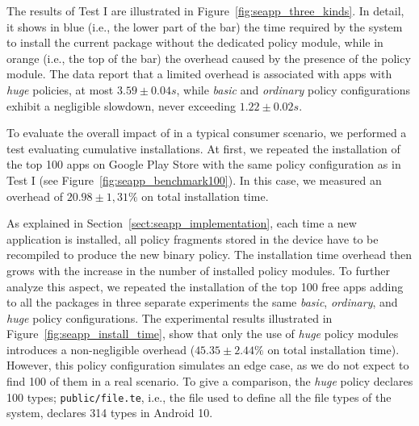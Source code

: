 The results of Test I are illustrated in
Figure~\ref{fig:seapp_three_kinds}.  In detail, it shows in blue
(i.e., the lower part of the bar) the time required by the system to
install the current package without the dedicated policy module, while
in orange (i.e., the top of the bar) the overhead caused by the
presence of the policy module.  The data report that a limited
overhead is associated with apps with \textit{huge} policies, at most
$3.59 \pm 0.04 s$, while \textit{basic} and \textit{ordinary} policy
configurations exhibit a negligible slowdown, never exceeding
$1.22 \pm 0.02 s$.

To evaluate the overall impact of \pap in a typical consumer scenario,
we performed a test evaluating cumulative installations.  At first, we
repeated the installation of the top 100 apps on Google Play Store
with the same policy configuration as in Test I (see
Figure~\ref{fig:seapp_benchmark100}).  In this case, we measured an
overhead of $20.98 \pm 1,31\%$ on total installation time.

As explained in Section~\ref{sect:seapp_implementation}, each time a
new application is installed, all policy fragments stored in the
device have to be recompiled to produce the new binary policy.  The
installation time overhead then grows with the increase in the number
of installed policy modules.  To further analyze this aspect, we
repeated the installation of the top 100 free apps adding to all the
packages in three separate experiments the same \textit{basic},
\textit{ordinary}, and \textit{huge} policy configurations.  The
experimental results illustrated in
Figure~\ref{fig:seapp_install_time}, show that only the use of {\em
  huge} policy modules introduces a non-negligible overhead
($45.35 \pm 2.44\%$ on total installation time).  However, this policy
configuration simulates an edge case, as we do not expect to find 100
of them in a real scenario. To give a comparison, the {\em huge}
policy declares 100 types; {\tt public/file.te}, i.e., the file used
to define all the file types of the system, declares 314 types in
Android 10.

